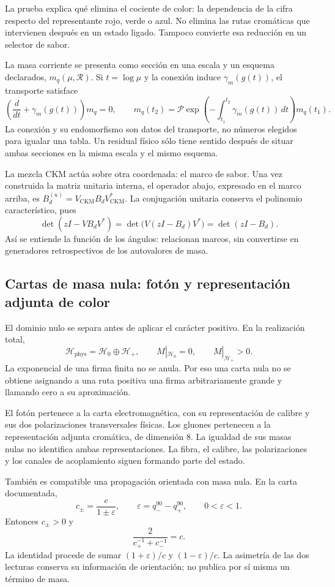 La prueba explica qué elimina el cociente de color: la dependencia de
la cifra respecto del representante rojo, verde o azul. No elimina las
rutas cromáticas que intervienen después en un estado ligado. Tampoco
convierte esa reducción en un selector de sabor.

La masa corriente se presenta como sección en una escala y un esquema
declarados, \(m_q(\mu,\mathscr R)\). Si \(t=\log\mu\) y la conexión
induce \(\gamma_m(g(t))\), el transporte satisface
\[
 \left(\frac{d}{dt}+\gamma_m(g(t))\right)m_q=0,
 \qquad
 m_q(t_2)=\mathcal P\exp\left(-\int_{t_1}^{t_2}
 \gamma_m(g(t))\,dt\right)m_q(t_1).
\]
La conexión y su endomorfismo son datos del transporte, no números
elegidos para igualar una tabla. Un residual físico sólo tiene sentido
después de situar ambas secciones en la misma escala y el mismo esquema.

La mezcla CKM actúa sobre otra coordenada: el marco de sabor. Una vez
construida la matriz unitaria interna, el operador abajo, expresado en
el marco arriba, es \(B_d^{(u)}=V_{\mathrm{CKM}}B_dV_{\mathrm{CKM}}^*\).
La conjugación unitaria conserva el polinomio característico, pues
\[
 \det(zI-VB_dV^*)=\det\bigl(V(zI-B_d)V^*\bigr)=\det(zI-B_d).
\]
Así se entiende la función de los ángulos: relacionan marcos, sin
convertirse en generadores retrospectivos de los autovalores de masa.

\subsection{Cartas de masa nula: fotón y representación adjunta de color}
\label{vi:vi:subsec:nulo-familias}

El dominio nulo se separa antes de aplicar el carácter positivo. En la
realización total,
\[
 \mathcal H_{\mathrm{phys}}=\mathcal H_0\oplus\mathcal H_+,
 \qquad M|_{\mathcal H_0}=0,\qquad M|_{\mathcal H_+}>0.
\]
La exponencial de una firma finita no se anula. Por eso una carta nula
no se obtiene asignando a una ruta positiva una firma arbitrariamente
grande y llamando cero a su aproximación.

El fotón pertenece a la carta electromagnética, con su representación
de calibre y sus dos polarizaciones transversales físicas. Los gluones
pertenecen a la representación adjunta cromática, de dimensión \(8\).
La igualdad de sus masas nulas no identifica ambas representaciones.
La fibra, el calibre, las polarizaciones y los canales de acoplamiento
siguen formando parte del estado.

También es compatible una propagación orientada con masa nula. En la
carta documentada,
\[
 c_\pm=\frac{c}{1\pm\varepsilon},\qquad
 \varepsilon=q_-^{90}-q_+^{90},\qquad0<\varepsilon<1.
\]
Entonces \(c_\pm>0\) y
\[
 \frac{2}{c_+^{-1}+c_-^{-1}}=c.
\]
La identidad procede de sumar \((1+\varepsilon)/c\) y
\((1-\varepsilon)/c\). La asimetría de las dos lecturas conserva su
información de orientación; no publica por sí misma un término de masa.

